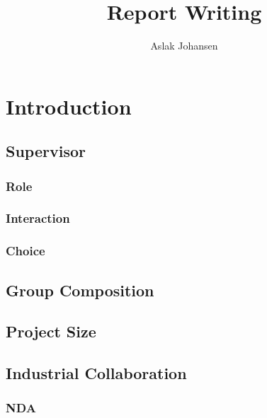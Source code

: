 \documentclass[a4paper]{memoir}
\title{Report Writing \\ \scalebox{0.85}{for Software BSc and MSc Projects}}
\author{Aslak Johansen}
\begin{document}
\maketitle
\tableofcontents

\chapter{Introduction}

\section{Supervisor}

\subsection{Role}

\subsection{Interaction}

\subsection{Choice}

\section{Group Composition}




\section{Project Size}
\label{sec:projectsize}

\section{Industrial Collaboration}




\subsection{NDA}
\end{document}
